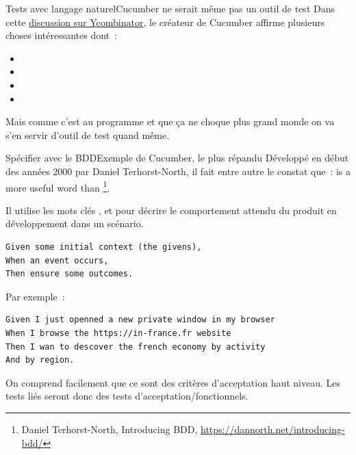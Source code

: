 \documentclass{beamer}
\begin{document}
    \begin{frame}{Tests avec langage naturel}{Cucumber ne serait même pas un outil de test}
        \transdissolve
        Dans cette \href{https://news.ycombinator.com/item?id=10194242}{discussion sur Ycombinator}, le créateur de Cucumber affirme plusieurs choses intéressantes dont~:
        \begin{itemize}
            \item {}
            \item {}
            \item {}
            \item {}
        \end{itemize}
        Mais comme c'est au programme et que ça ne choque plus grand monde on va s'en servir d'outil de test quand même. 
    \end{frame}

    \begin{frame}[fragile]{Spécifier avec le BDD}{Exemple de Cucumber, le plus répandu}
        \transdissolve
        Développé en début des années 2000 par Daniel Terhorst-North, il fait entre autre le constat que~:  is a more useful word than \footnote{Daniel Terhorst-North, Introducing BDD, \url{https://dannorth.net/introducing-bdd/}}.

        Il utilise les mots clés ,  et  pour décrire le comportement attendu du produit en développement dans un scénario.
        \begin{lstlisting}
Given some initial context (the givens),
When an event occurs,
Then ensure some outcomes.
        \end{lstlisting}
        Par exemple~:
        \begin{lstlisting}
Given I just openned a new private window in my browser
When I browse the https://in-france.fr website
Then I wan to descover the french economy by activity
And by region.
        \end{lstlisting}
        On comprend facilement que ce sont des critères d'acceptation haut niveau.
        Les tests liés seront donc des tests d'acceptation/fonctionnels.
    \end{frame}
\end{document}
